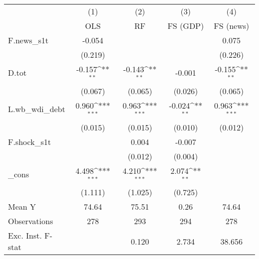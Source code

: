 {
\def\sym#1{\ifmmode^{#1}\else\(^{#1}\)\fi}
\begin{tabular}{l*{4}{c}}
\toprule
            &\multicolumn{1}{c}{(1)}&\multicolumn{1}{c}{(2)}&\multicolumn{1}{c}{(3)}&\multicolumn{1}{c}{(4)}\\
            &\multicolumn{1}{c}{OLS}&\multicolumn{1}{c}{RF}&\multicolumn{1}{c}{FS (GDP)}&\multicolumn{1}{c}{FS (news)}\\
\midrule
F.news\_s1t  &      -0.054         &                     &                     &       0.075         \\
            &     (0.219)         &                     &                     &     (0.226)         \\
\addlinespace
D.tot       &      -0.157\sym{**} &      -0.143\sym{**} &      -0.001         &      -0.155\sym{**} \\
            &     (0.067)         &     (0.065)         &     (0.026)         &     (0.065)         \\
\addlinespace
L.wb\_wdi\_debt&       0.960\sym{***}&       0.963\sym{***}&      -0.024\sym{**} &       0.963\sym{***}\\
            &     (0.015)         &     (0.015)         &     (0.010)         &     (0.012)         \\
\addlinespace
F.shock\_s1t &                     &       0.004         &      -0.007         &                     \\
            &                     &     (0.012)         &     (0.004)         &                     \\
\addlinespace
\_cons      &       4.498\sym{***}&       4.210\sym{***}&       2.074\sym{**} &                     \\
            &     (1.111)         &     (1.025)         &     (0.725)         &                     \\
\midrule
Mean Y      &       74.64         &       75.51         &        0.26         &       74.64         \\
Observations&         278         &         293         &         294         &         278         \\
Exc. Inst. F-stat&                     &       0.120         &       2.734         &      38.656         \\
\bottomrule
\end{tabular}
}

